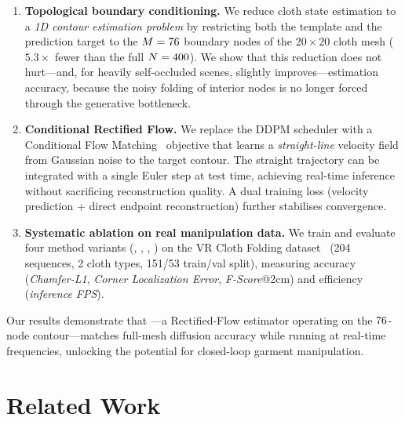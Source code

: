 \documentclass{article}
\begin{document}
\begin{enumerate}
    \item \textbf{Topological boundary conditioning.} We reduce cloth state estimation to a \emph{1D contour estimation problem} by restricting both the template and the prediction target to the $M=76$ boundary nodes of the $20\!\times\!20$ cloth mesh ($5.3\times$ fewer than the full $N=400$).
    We show that this reduction does not hurt---and, for heavily self-occluded scenes, slightly improves---estimation accuracy, because the noisy folding of interior nodes is no longer forced through the generative bottleneck.
    
    \item \textbf{Conditional Rectified Flow.} We replace the DDPM scheduler with a Conditional Flow Matching~\cite{lipman2023flow} objective that learns a \emph{straight-line} velocity field from Gaussian noise to the target contour. The straight trajectory can be integrated with a single Euler step at test time, achieving real-time inference without sacrificing reconstruction quality. A dual training loss (velocity prediction + direct endpoint reconstruction) further stabilises convergence.
    
    \item \textbf{Systematic ablation on real manipulation data.} We train and evaluate four method variants (\fullddpm, \edgeddpm, \fullfm, \edgefm) on the VR Cloth Folding dataset~\cite{tian2025uniclothdiff} (204 sequences, 2 cloth types, 151/53 train/val split), measuring accuracy (\emph{Chamfer-L1}, \emph{Corner Localization Error}, \emph{F-Score}@2cm) and efficiency (\emph{inference FPS}).
\end{enumerate}

Our results demonstrate that \edgefm{}---a Rectified-Flow estimator operating on the $76$-node contour---matches full-mesh diffusion accuracy while running at real-time frequencies, unlocking the potential for closed-loop garment manipulation.


\section{Related Work}
\label{sec:related_work}
\end{document}
